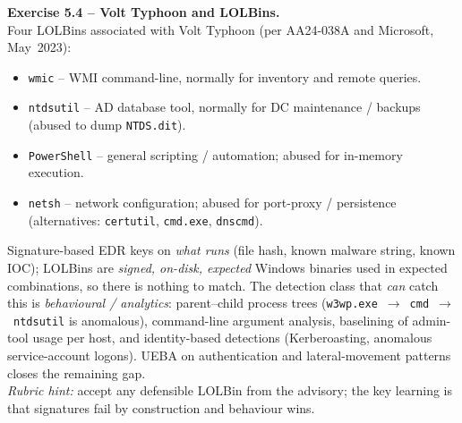 \documentclass[11pt,a4paper]{article}
\begin{document}
\begin{solutionbox}
\textbf{Exercise 5.4 -- Volt Typhoon and LOLBins.}\\
Four LOLBins associated with Volt Typhoon (per AA24-038A and Microsoft, May~2023):
\begin{itemize}\setlength{\itemsep}{0pt}
  \item \texttt{wmic} -- WMI command-line, normally for inventory and remote queries.
  \item \texttt{ntdsutil} -- AD database tool, normally for DC maintenance / backups
        (abused to dump \texttt{NTDS.dit}).
  \item \texttt{PowerShell} -- general scripting / automation; abused for in-memory execution.
  \item \texttt{netsh} -- network configuration; abused for port-proxy / persistence
        (alternatives: \texttt{certutil}, \texttt{cmd.exe}, \texttt{dnscmd}).
\end{itemize}
Signature-based EDR keys on \emph{what runs} (file hash, known malware string, known IOC);
LOLBins are \emph{signed, on-disk, expected} Windows binaries used in expected combinations,
so there is nothing to match. The detection class that \emph{can} catch this is
\emph{behavioural / analytics}: parent--child process trees (\texttt{w3wp.exe}~$\to$~\texttt{cmd}~$\to$~\texttt{ntdsutil}
is anomalous), command-line argument analysis, baselining of admin-tool usage per host,
and identity-based detections (Kerberoasting, anomalous service-account logons). UEBA on
authentication and lateral-movement patterns closes the remaining gap.\\[2pt]
\emph{Rubric hint:} accept any defensible LOLBin from the advisory; the key learning is that
signatures fail by construction and behaviour wins.
\end{solutionbox}
\end{document}
